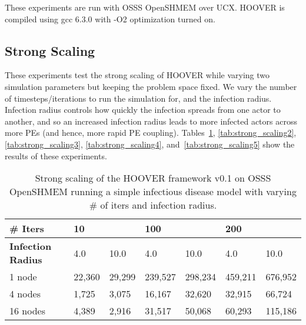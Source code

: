 These experiments are run with OSSS OpenSHMEM over UCX. HOOVER is compiled using
gcc 6.3.0 with -O2 optimization turned on.

\subsection{Strong Scaling}
\label{sec:strong_scaling}

These experiments test the strong scaling of HOOVER while varying two
simulation parameters but keeping the problem space fixed. We vary the number of
timesteps/iterations to run the simulation for, and the infection radius.
Infection radius controls how quickly the infection spreads from one actor to
another, and so an increased infection radius leads to more infected actors
across more PEs (and hence, more rapid PE coupling).
Tables~\ref{tab:strong_scaling1}, \ref{tab:strong_scaling2},
\ref{tab:strong_scaling3}, \ref{tab:strong_scaling4},
and~\ref{tab:strong_scaling5} show the results of these experiments.

\begin{table}
\centering
\begin{tabularx}{\textwidth}{ | l || X | X | X | X | X | X | }
\hline
\textbf{\# Iters}           & \multicolumn{2}{|X|}{\textbf{10}} & \multicolumn{2}{|X|}{\textbf{100}} & \multicolumn{2}{|X|}{\textbf{200}} \\\hline
\textbf{Infection Radius}   & 4.0          & 10.0         & 4.0           & 10.0          & 4.0           & 10.0 \\\hline
1 node                      & 22,360 & 29,299 & 239,527 & 298,234 & 459,211 & 676,952 \\\hline
4 nodes                     & 1,725  & 3,075  & 16,167  & 32,620  & 32,915  & 66,724 \\\hline
16 nodes                    & 4,389  & 2,916  & 31,517  & 50,068  & 60,293  & 115,186 \\\hline
\end{tabularx}
\caption{Strong scaling of the HOOVER framework v0.1 on OSSS OpenSHMEM running a
    simple infectious disease model with varying \# of iters and infection
    radius.}
\label{tab:strong_scaling1}
\end{table}

